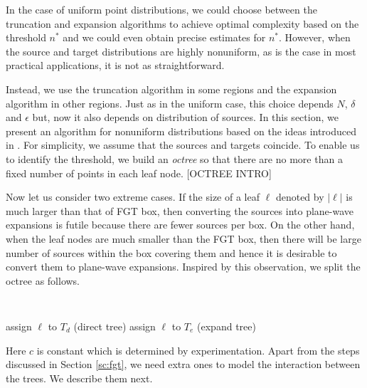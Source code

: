 

In the case of uniform point distributions, we could choose between the truncation and expansion algorithms to achieve optimal complexity
 based on the threshold $n^*$ and we could even obtain precise estimates for $n^*$. However, when the source and 
 target distributions are highly nonuniform, as is the case in most practical applications, it is not as
 straightforward. 
 
 Instead, we use the truncation algorithm in some regions and the expansion algorithm in other regions.  
 Just as in the uniform case, this choice depends $N$, $\delta$ and $\epsilon$ but, now it also 
 depends on distribution of sources. In this section, we present an algorithm for nonuniform distributions based on the ideas introduced in \cite{veerapaneni08}. 
For simplicity, we assume that the sources and targets coincide. To enable us to identify the threshold, we build an {\em octree} so that there are no more than a fixed number of points in each leaf node. [OCTREE INTRO]

%

Now let us consider two extreme cases. If the size of a leaf $\ell$ denoted by $|\ell|$ is much larger than that of FGT box, then converting the sources into plane-wave expansions is futile because there are fewer sources per box. On the other hand, when the leaf nodes are much smaller than the FGT box, then there will be large number of sources within the box covering them and hence it is desirable to convert them to plane-wave expansions. Inspired by this observation, we split the octree as follows. 
%
{\tt
\begin{algorithmic}
\STATE
          \STATE assign $\ell$ to $T_d$ (direct tree)
      \ELSE
          \STATE assign $\ell$ to $T_e$ (expand tree)
      \ENDIF
  \ENDFOR
\STATE
\end{algorithmic}
}
%
Here $c$ is constant which is determined by experimentation. Apart from the steps discussed in Section \ref{sc:fgt}, we need extra ones to model the interaction between the trees. We describe them next.  

